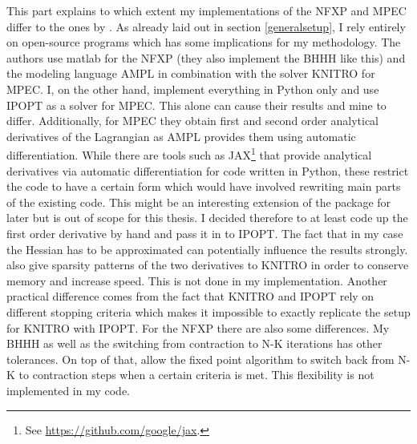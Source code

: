 This part explains to which extent my implementations of the NFXP and MPEC differ to the ones by \cite{Iskhakov.2016}. As already laid out in section \ref{generalsetup}, I rely entirely on open-source programs which has some implications for my methodology. The authors use matlab for the NFXP (they also implement the BHHH like this) and the modeling language AMPL in combination with the solver KNITRO for MPEC. I, on the other hand, implement everything in Python only and use IPOPT as a solver for MPEC. This alone can cause their results and mine to differ. Additionally, for MPEC they obtain first and second order analytical derivatives of the Lagrangian as AMPL provides them using automatic differentiation. While there are tools such as JAX\footnote{ See \url{https://github.com/google/jax}.} that provide analytical derivatives via automatic differentiation for code written in Python, these restrict the code to have a certain form which would have involved rewriting main parts of the existing code. This might be an interesting extension of the package for later but is out of scope for this thesis. I decided therefore to at least code up the first order derivative by hand and pass it in to IPOPT. The fact that in my case the Hessian has to be approximated can potentially influence the results strongly. \citeauthor{Iskhakov.2016} also give sparsity patterns of the two derivatives to KNITRO in order to conserve memory and increase speed. This is not done in my implementation. Another practical difference comes from the fact that KNITRO and IPOPT rely on different stopping criteria which makes it impossible to exactly replicate the setup for KNITRO with IPOPT. For the NFXP there are also some differences. My BHHH as well as the switching from contraction to N-K iterations has other tolerances. On top of that, \citeauthor{Iskhakov.2016} allow the fixed point algorithm to switch back from N-K to contraction steps when a certain criteria is met. This flexibility is not implemented in my code.

